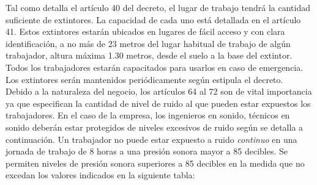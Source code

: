 Tal como detalla el artículo 40 del decreto, el lugar de 
trabajo tendrá la cantidad suficiente de extintores. La 
capacidad de cada uno está detallada en el artículo 41. Estos
extintores estarán ubicados en lugares de fácil acceso y con
clara identificación, a no más de 23 metros del lugar habitual
de trabajo de algún trabajador, altura máxima 1.30 metros, desde
el suelo a la base del extintor. Todos los trabajadores
estarán capacitados para usarlos en caso de emergencia. Los
extintores serán mantenidos periódicamente según estipula
el decreto.\\

Debido a la naturaleza del negocio, los artículos 64 al 72 
son de vital importancia ya que especifican la cantidad
de nivel de ruido al que pueden estar expuestos los
trabajadores. En el caso de la empresa, los ingenieros en
sonido, técnicos en sonido deberán estar protegidos de
niveles excesivos de ruido según se detalla a continuación.
Un trabajador no puede estar expuesto a ruido \emph{continuo} en
una jornada de trabajo de 8 horas a una presión sonora
mayor a 85 decibles. Se permiten niveles de presión sonora
superiores a 85 decibles en la medida que no excedan los
valores indicados en la siguiente tabla:

